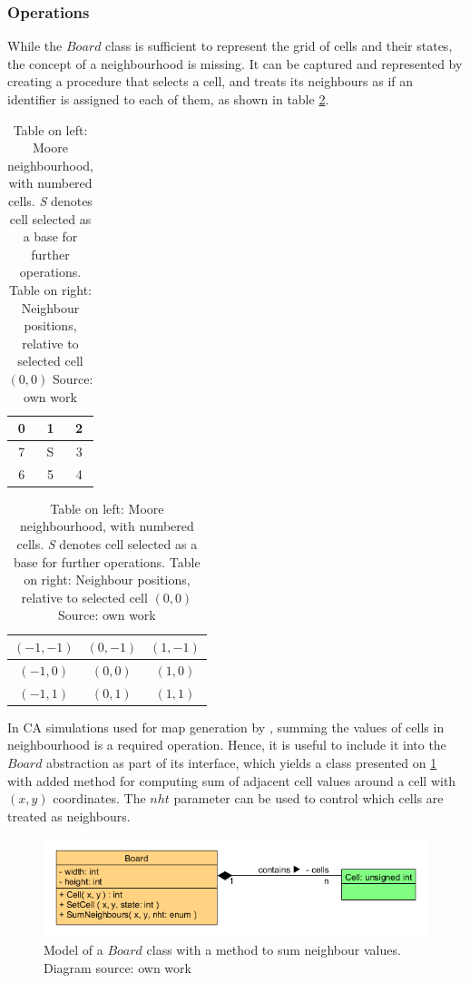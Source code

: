 \documentclass[12pt]{report}
\begin{document}
\subsubsection{Operations}
While the $Board$ class is sufficient to represent the grid of cells and their states, the concept of a neighbourhood is missing. It can be captured and represented by creating a procedure that selects a cell, and treats its neighbours as if an identifier is assigned to each of them, as shown in table \cref{tab:cellneighbors}. 

\begin{table}[h] 
	\centering 
	\begin{tabular}{| c | c | c |}\hline 
		0 & 1 & 2 \\ \hline
		7 & S & 3 \\ \hline
		6 & 5 & 4 \\ \hline
	\end{tabular} 
	\begin{tabular}{| c | c | c |}\hline 
		$(-1,-1)$ & $( 0,-1)$ & $( 1,-1)$ \\ \hline
		$(-1, 0)$ & $( 0, 0)$ & $( 1, 0)$ \\ \hline
		$(-1, 1)$ & $( 0, 1)$ & $( 1, 1)$ \\ \hline
	\end{tabular} 
	\caption{Table on left: Moore neighbourhood, with numbered cells. \textit{S} denotes cell selected as a base for further operations. Table on right: Neighbour positions, relative to selected cell $(0,0)$ Source: own work}
	\label{tab:cellneighbors}
\end{table}

In CA simulations used for map generation by \autocite{johnson2010cellular}, summing the values of cells in neighbourhood is a required operation. Hence, it is useful to include it into the $Board$ abstraction as part of its interface, which yields a class presented on \cref{fig:boardcell2} with added method for computing sum of adjacent cell values around a cell with $(x,y)$ coordinates. The $nht$ parameter can be used to control which cells are treated as neighbours.

\begin{figure}[h]
	\centering
	\includegraphics[width=0.8\linewidth]{diagrams/boardcell02}
	\caption{Model of a $Board$ class with a method to sum neighbour values. Diagram source: own work} 
	\label{fig:boardcell2}
\end{figure} 
\end{document}
